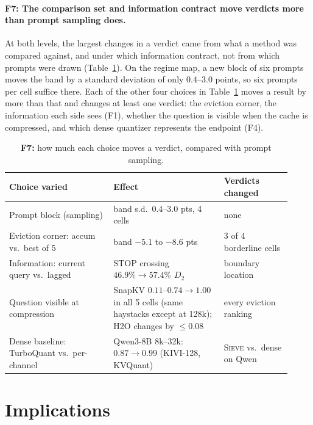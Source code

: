 \documentclass{article}
\newcommand{\sieve}{\textsc{Sieve}}
\theoremstyle{definition}
\begin{document}
\paragraph{F7: The comparison set and information contract move verdicts more than prompt sampling does.}
At both levels, the largest changes in a verdict came from what a method was compared against, and under which information contract, not from which prompts were drawn (Table~\ref{tab:contract}).  On the regime map, a new block of six prompts moves the band by a standard deviation of only $0.4$--$3.0$ points, so six prompts per cell suffice there.  Each of the other four choices in Table~\ref{tab:contract} moves a result by more than that and changes at least one verdict: the eviction corner, the information each side sees (F1), whether the question is visible when the cache is compressed, and which dense quantizer represents the endpoint (F4).
\begin{table}[t]
\centering
\small
\setlength{\tabcolsep}{4pt}
\caption{\textbf{F7:} how much each choice moves a verdict, compared with prompt sampling.}
\label{tab:contract}
\begin{tabular}{@{}p{0.34\linewidth}p{0.36\linewidth}p{0.22\linewidth}@{}}
\toprule
\textbf{Choice varied} & \textbf{Effect} & \textbf{Verdicts changed} \\
\midrule
Prompt block (sampling) & band s.d.\ $0.4$--$3.0$ pts, 4 cells & none \\
Eviction corner: accum vs.\ best of 5 & band $-5.1$ to $-8.6$ pts & 3 of 4 borderline cells \\
Information: current query vs.\ lagged & STOP crossing $46.9\%\to57.4\%$ $D_2$ & boundary location \\
Question visible at compression & SnapKV $0.11$--$0.74\to1.00$ in all 5 cells (same haystacks except at 128k); H2O changes by $\le0.08$ & every eviction ranking \\
Dense baseline: TurboQuant vs.\ per-channel & Qwen3-8B 8k--32k: $0.87\to0.99$ (KIVI-128, KVQuant) & \sieve{} vs.\ dense on Qwen \\
\bottomrule
\end{tabular}
\vspace{-2mm}
\end{table}


\section{Implications}
\label{sec:implications}
\end{document}
